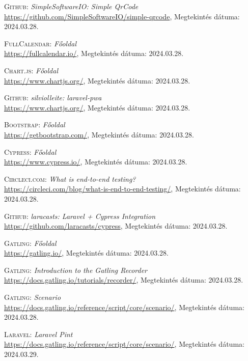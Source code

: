 \documentclass[
]{thesis-ekf}
\theoremstyle{definition}
\theoremstyle{remark}
\begin{document}
\begin{thebibliography}{47}
\textsc{Github}: \emph{SimpleSoftwareIO: Simple QrCode}
\\
\url{https://github.com/SimpleSoftwareIO/simple-qrcode}, Megtekintés dátuma: 2024.03.28.

\textsc{FullCalendar}: \emph{Főoldal}
\\
\url{https://fullcalendar.io/}, Megtekintés dátuma: 2024.03.28.

\textsc{Chart.js}: \emph{Főoldal}
\\
\url{https://www.chartjs.org/}, Megtekintés dátuma: 2024.03.28.

\textsc{Github}: \emph{silviolleite: laravel-pwa}
\\
\url{https://www.chartjs.org/}, Megtekintés dátuma: 2024.03.28.

\textsc{Bootstrap}: \emph{Főoldal}
\\
\url{https://getbootstrap.com/}, Megtekintés dátuma: 2024.03.28.

\textsc{Cypress}: \emph{Főoldal}
\\
\url{https://www.cypress.io/}, Megtekintés dátuma: 2024.03.28.

\textsc{Circleci.com}: \emph{What is end-to-end testing?}
\\
\url{https://circleci.com/blog/what-is-end-to-end-testing/}, Megtekintés dátuma: 2024.03.28.

\textsc{Github}: \emph{laracasts: Laravel + Cypress Integration}
\\
\url{https://github.com/laracasts/cypress}, Megtekintés dátuma: 2024.03.28.

\textsc{Gatling}: \emph{Főoldal}
\\
\url{https://gatling.io/}, Megtekintés dátuma: 2024.03.28.

\textsc{Gatling}: \emph{Introduction to the Gatling Recorder}
\\
\url{https://docs.gatling.io/tutorials/recorder/}, Megtekintés dátuma: 2024.03.28.

\textsc{Gatling}: \emph{Scenario}
\\
\url{https://docs.gatling.io/reference/script/core/scenario/}, Megtekintés dátuma: 2024.03.28.

\textsc{Laravel}: \emph{Laravel Pint}
\\
\url{https://docs.gatling.io/reference/script/core/scenario/}, Megtekintés dátuma: 2024.03.29.


\end{thebibliography}
\end{document}
